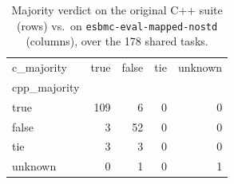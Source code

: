\begin{table}[t]
  \centering
  \caption{Majority verdict on the original C++ suite (rows) vs.\ on \texttt{esbmc-eval-mapped-nostd} (columns), over the 178 shared tasks.}
  \label{tab:dual-majority-esbmc-eval-mapped-nostd}
\begin{tabular}{lrrrr}
\toprule
c_majority & true & false & tie & unknown \\
cpp_majority &  &  &  &  \\
\midrule
true & 109 & 6 & 0 & 0 \\
false & 3 & 52 & 0 & 0 \\
tie & 3 & 3 & 0 & 0 \\
unknown & 0 & 1 & 0 & 1 \\
\bottomrule
\end{tabular}
\end{table}
